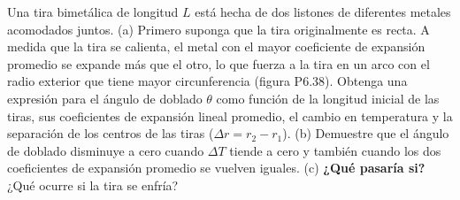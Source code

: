\item Una tira bimetálica de longitud $L$ está hecha de dos listones de diferentes metales acomodados juntos. 
(a) Primero suponga que la tira originalmente es recta. A medida que la tira se calienta, el metal con el mayor coeficiente de expansión promedio se expande más que el otro, lo que fuerza a la tira en un arco con el radio exterior que tiene mayor circunferencia (figura P6.38). Obtenga una expresión para el ángulo de doblado $\theta$ como función de la longitud inicial de las tiras, sus coeficientes de expansión lineal promedio, el cambio en temperatura y la separación de los centros de las tiras ($\Delta r = r_2 - r_1$). 
(b) Demuestre que el ángulo de doblado disminuye a cero cuando $\Delta T$ tiende a cero y también cuando los dos coeficientes de expansión promedio se vuelven iguales. 
(c) \textbf{¿Qué pasaría si?} ¿Qué ocurre si la tira se enfría?
